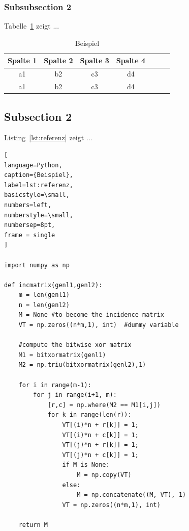 \documentclass{article}
\begin{document}
\subsubsection{Subsubsection 2}
\label{subsubsec:label_abschnitt2}


Tabelle~\ref{tab:example} zeigt ...

\begin{table}[h]
\renewcommand{\arraystretch}{1.0}
\centering
\begin{tabular}{ccccccc}
\hline
\textbf{Spalte 1} & \textbf{Spalte 2} & \textbf{Spalte 3} & \textbf{Spalte 4} \\
\hline
a1 & b2 & c3 & d4  \\ %
a1 & b2 & c3 & d4  \\ %
\hline
\end{tabular}
\caption{Beispiel}
\label{tab:example}
\end{table}



\subsection{Subsection 2}
\label{subsec:label_fuer_referenz_unterkapitel2}


Listing~\ref{lst:referenz} zeigt ...


\begin{lstlisting}[
language=Python,
caption={Beispiel}, 
label=lst:referenz,
basicstyle=\small, 
numbers=left, 
numberstyle=\small, 
numbersep=8pt, 
frame = single 
]

import numpy as np
 
def incmatrix(genl1,genl2):
    m = len(genl1)
    n = len(genl2)
    M = None #to become the incidence matrix
    VT = np.zeros((n*m,1), int)  #dummy variable
 
    #compute the bitwise xor matrix
    M1 = bitxormatrix(genl1)
    M2 = np.triu(bitxormatrix(genl2),1) 
 
    for i in range(m-1):
        for j in range(i+1, m):
            [r,c] = np.where(M2 == M1[i,j])
            for k in range(len(r)):
                VT[(i)*n + r[k]] = 1;
                VT[(i)*n + c[k]] = 1;
                VT[(j)*n + r[k]] = 1;
                VT[(j)*n + c[k]] = 1;
                if M is None:
                    M = np.copy(VT)
                else:
                    M = np.concatenate((M, VT), 1)
                VT = np.zeros((n*m,1), int)
 
    return M
\end{lstlisting}
\end{document}
